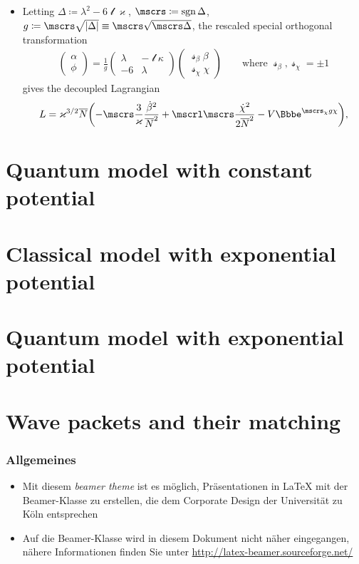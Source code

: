 \documentclass{beamer}
\begin{document}
\begin{itemize}
\item Letting $\Delta \coloneqq \lambda^2 - 6\mscrl\varkappa$,
$\mscrs \coloneqq \sgn \Delta$,
$g \coloneqq \mscrs \sqrt{\vbr{\Delta}} \equiv \mscrs\sqrt{\mscrs\Delta}$,
the rescaled special orthogonal transformation
\begin{align}
\begin{pmatrix}
\alpha \\ \phi
\end{pmatrix} = \frac{1}{g}
\begin{pmatrix}
\lambda & -\mscrl\kappa \\
-6 & \lambda
\end{pmatrix}
\begin{pmatrix}
\mscrs_\beta \beta \\ \mscrs_\chi \chi
\end{pmatrix}\qquad\text{where } \mscrs_\beta, \mscrs_\chi = \pm 1
\end{align}
gives the decoupled Lagrangian
\begin{align}
L = \varkappa^{3/2}\overline{N}
\rbr{-\mscrs\frac{3}{\varkappa}\frac{\dot{\beta}^2}{\overline{N}^2}
+\mscrl\mscrs\frac{\dot{\chi}^2}{2\overline{N}^2}
-V\ee^{\mscrs_\chi g\chi}},
\end{align}

\end{itemize}



\section{Quantum model with constant potential}

\section{Classical model with exponential potential}

\section{Quantum model with exponential potential}

\section{Wave packets and their matching}

\begin{frame}
  \frametitle{Allgemeines}

  \begin{itemize}
  \item Mit diesem \emph{beamer theme} ist es möglich, Präsentationen in
    \LaTeX{} mit der Beamer-Klasse zu erstellen, die dem Corporate Design der
    Universität zu Köln entsprechen
  \item Auf die Beamer-Klasse wird in diesem Dokument nicht näher eingegangen,
    nähere Informationen finden Sie unter
    \url{http://latex-beamer.sourceforge.net/}
  \end{itemize}

\end{frame}
\end{document}
